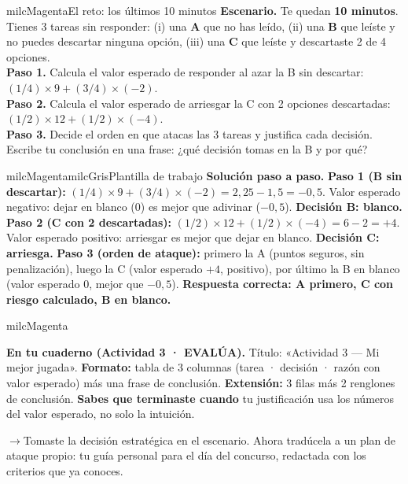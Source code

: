 \documentclass[11pt,letterpaper]{article}
\newcommand{\puente}[1]{%
  \begin{puentebox}%
    \textcolor{milcGradeDark}{$\rightarrow$}\hspace{2mm}#1%
  \end{puentebox}%
}
\newcommand{\checkbox}{\textcolor{milcGradeDark}{\fbox{\phantom{x}}}\hspace{5pt}}
\begin{document}
\begin{drawbox}{milcMagenta}{El reto: los últimos 10 minutos}
\checkbox \textbf{Escenario.} Te quedan \textbf{10 minutos}. Tienes 3 tareas sin responder: (i) una \textbf{A} que no has leído, (ii) una \textbf{B} que leíste y no puedes descartar ninguna opción, (iii) una \textbf{C} que leíste y descartaste 2 de 4 opciones. \\[2mm]
\checkbox \textbf{Paso 1.} Calcula el valor esperado de responder al azar la B sin descartar: $(1/4) \times 9 + (3/4) \times (-2)$. \\[2mm]
\checkbox \textbf{Paso 2.} Calcula el valor esperado de arriesgar la C con 2 opciones descartadas: $(1/2) \times 12 + (1/2) \times (-4)$. \\[2mm]
\checkbox \textbf{Paso 3.} Decide el orden en que atacas las 3 tareas y justifica cada decisión. \\[2mm]
\checkbox Escribe tu conclusión en una frase: ¿qué decisión tomas en la B y por qué?
\end{drawbox}

\begin{softbox}{milcMagenta}{milcGris}{Plantilla de trabajo}
\textbf{Solución paso a paso.} \textbf{Paso 1 (B sin descartar):} $(1/4) \times 9 + (3/4) \times (-2) = 2{,}25 - 1{,}5 = -0{,}5$. Valor esperado negativo: dejar en blanco ($0$) es mejor que adivinar ($-0{,}5$). \textbf{Decisión B: blanco.} \textbf{Paso 2 (C con 2 descartadas):} $(1/2) \times 12 + (1/2) \times (-4) = 6 - 2 = +4$. Valor esperado positivo: arriesgar es mejor que dejar en blanco. \textbf{Decisión C: arriesga.} \textbf{Paso 3 (orden de ataque):} primero la A (puntos seguros, sin penalización), luego la C (valor esperado $+4$, positivo), por último la B en blanco (valor esperado $0$, mejor que $-0{,}5$). \textbf{Respuesta correcta: A primero, C con riesgo calculado, B en blanco.}
\end{softbox}

\begin{infoband}{milcMagenta}


\textbf{En tu cuaderno (Actividad 3 · EVALÚA).} Título: «Actividad 3 --- Mi mejor jugada». \textbf{Formato:} tabla de 3 columnas (tarea · decisión · razón con valor esperado) más una frase de conclusión. \textbf{Extensión:} 3 filas más 2 renglones de conclusión. \textbf{Sabes que terminaste cuando} tu justificación usa los números del valor esperado, no solo la intuición.
\end{infoband}

\puente{Tomaste la decisión estratégica en el escenario. Ahora tradúcela a un plan de ataque propio: tu guía personal para el día del concurso, redactada con los criterios que ya conoces.}
\end{document}
